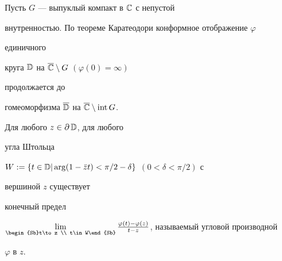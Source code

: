 \begin{note} Пусть $G$ --- выпуклый компакт в $\Bbb C$ с непустой 


внутренностью. По теореме Каратеодори конформное отображение $\varphi$ 


единичного 


круга $\Bbb D$ на $\overline{\Bbb C}\setminus G$ $(\varphi(0)=\infty)$ 


продолжается до 


гомеоморфизма $\overline{\Bbb D}$ на $\overline{\Bbb C}\setminus \operatorname{int} G$. 


Для любого $z\in\partial\,\Bbb D$, для любого 


угла Штольца 


$W:=\{t\in\Bbb D\vert\arg(1-\Bar zt)<\pi/2-\delta\}$ $(0<\delta<\pi/2)$ с 


вершиной $z$ существует 


конечный предел 


$\lim\limits_{\begin{Sb}t\to z \\ t\in W\end{Sb}} 


\frac{\varphi(t)-\varphi(z)}{t-z}$, называемый угловой производной 


$\varphi$ в $z$. 


\end{note}


 


